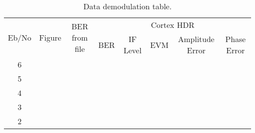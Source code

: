 \begin{table}[H]
\centering
\begin{tabular}{|c|c|c|c|c|c|c|c|}\hline
\multirow{2}{*}{ Eb/No } & \multirow{2}{*}{ Figure } & \multirow{2}{*}{ BER from file } & \multicolumn{5}{|c|}{Cortex HDR} \\\cline{4-8}
& & & BER & IF Level & EVM & Amplitude Error & Phase Error \\\hline
6 & & & & & & & \\\hline
5 & & & & & & & \\\hline
4 & & & & & & & \\\hline
3 & & & & & & & \\\hline
2 & & & & & & & \\\hline
\end{tabular} 
	\caption{Data demodulation table.}
	\label{tab:data-demod-cortex}
\end{table}

